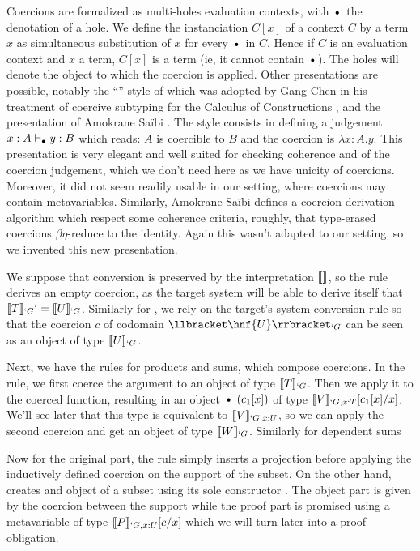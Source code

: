 \documentclass{llncs}
\begin{document}

Coercions are formalized as multi-holes evaluation contexts, with
$\ctxdot$ the denotation of a hole. We define the instanciation $C[x]$ of a context $C$
by a term $x$ as simultaneous substitution of $x$ for every $\ctxdot$ in $C$.
Hence if $C$ is an evaluation context and $x$ a term, $C[x]$ is a term
(ie, it cannot contain $\ctxdot$).
The holes will denote the object to which the coercion is applied. Other
presentations are possible, notably the ``\LMS{}'' style of \cite{longo95logic} which
was adopted by Gang Chen in his treatment of coercive subtyping for the
Calculus of Constructions \cite{conf/popl/Chen03}, and the presentation 
of Amokrane Sa\"ibi \cite{saibi97inheritance}. The \LMS{} style consists
in defining a judgement $x : A \vdash_{\bullet} y : B$ which reads: $A$ is
coercible to $B$ and the coercion is $\lambda x : A.y$. This
presentation is very elegant and well suited for checking coherence and
of the coercion judgement, which we don't need here as we have unicity
of coercions. Moreover, it did not seem readily usable in
our setting, where coercions may contain metavariables. Similarly, Amokrane Sa\"ibi defines
a coercion derivation algorithm which respect some coherence criteria,
roughly, that type-erased coercions $\beta\eta$-reduce to the
identity. Again this wasn't adapted to our setting, so we invented this
new presentation. 

We suppose that conversion is preserved by the interpretation $\llbracket  \rrbracket_{}$, so
the rule  derives an empty coercion, as the target system
will be able to derive itself that $\llbracket T \rrbracket_{`G} `= \llbracket U \rrbracket_{`G}$.
Similarly for , we rely on the target's system conversion
rule so that the coercion $c$ of codomain $\ip{\hnf{U}}{`G}$ can be seen
as an object of type $\llbracket U \rrbracket_{`G}$.

Next, we have the rules for products and sums, which compose
coercions. In the  rule, we first coerce the argument to
an object of type $\llbracket T \rrbracket_{`G}$. Then we apply it to the coerced
function, resulting in an object $\ctxdot~(c_1[x])$ of type
$\llbracket V \rrbracket_{`G, x : T}[c_1[x]/x]$. We'll see later that this type is equivalent to
$\llbracket V \rrbracket_{`G, x : U}$, so we can apply the second coercion and get an
object of type $\llbracket W \rrbracket_{`G}$. Similarly for dependent sums \TODO{}

Now for the original part, the  rule simply inserts a
projection before applying the inductively defined coercion on the
support of the subset. On the other hand,  creates and
object of a subset using its sole constructor . The object
part is given by the coercion between the support while the proof part
is promised using a metavariable of type $\llbracket P \rrbracket_{`G, x : U}[c/x]$ which
we will turn later into a proof obligation. 
\end{document}
